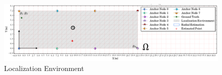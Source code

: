 \documentclass[conference]{IEEEtran}
\begin{document}
%
\IEEEpeerreviewmaketitle{}
\glsresetall{}


\begin{figure}[!pht]
  \centering
  \includegraphics[width=\linewidth]{figures/omega.png}
  \caption{\label{fig:omega} Localization Environment}
\end{figure}



\pagebreak




\end{document}
